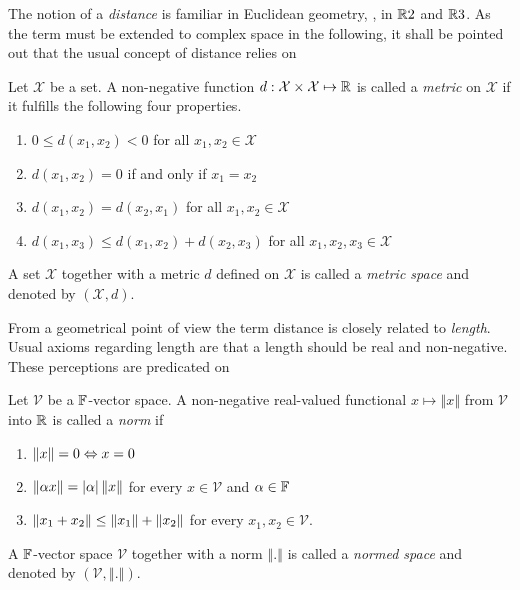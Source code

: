 The notion of a \emph{distance} is familiar in Euclidean geometry,
\ie, in $\mathbb{R}2$ and
$\mathbb{R}3$.
As the term must be extended to complex space in the following, it shall be
pointed out that the usual concept of distance relies on
\begin{definition}\label{def:metric}
	Let $\mathcal{X}$ be a set. A non-negative function
	$d: \mathcal{X} \times \mathcal{X} \mapsto \mathbb{R}$ is called a \emph{metric}
	on $\mathcal{X}$ if it fulfills the following four properties.
	\begin{enumerate}[label=(\alph*)]
		\item $0 \le d\left(x_1, x_2\right) < 0$ for all
		$x_1, x_2 \in \mathcal{X}$
		\item $d\left(x_1, x_2\right) = 0$ if and only if $x_1 = x_2$
		\item $d\left(x_1, x_2\right) = d\left(x_2, x_1\right)$ for all
		$x_1, x_2 \in \mathcal{X}$
		\item $d\left(x_1, x_3\right) \le d\left(x_1, x_2\right) + d\left(x_2, x_3\right)$
		for all $x_1, x_2, x_3 \in \mathcal{X}$
	\end{enumerate}
	A set $\mathcal{X}$ together with a metric $d$ defined on $\mathcal{X}$ is
	called a \emph{metric space} and denoted by $\left(\mathcal{X}, d\right)$.
\end{definition}

From a geometrical point of view the term distance is closely related to
\emph{length}.
Usual axioms regarding length are that a length should be real and non-negative.
These perceptions are predicated on
\begin{definition}\label{def:norm}
	Let $\mathcal{V}$ be a $\mathbb{F}$-vector space.
	A non-negative real-valued functional $x \mapsto \left\Vert x \right\Vert$
	from $\mathcal{V}$ into $\mathbb{R}$ is called a \emph{norm} if
	\begin{enumerate}[label=(\alph*)]
		\item $\left\Vert x \right\Vert = 0 \Leftrightarrow x = 0$ 
		\item $\left\Vert \alpha x \right\Vert = \left\vert\alpha\right\vert \left\Vert x \right\Vert$ for every
		$x \in \mathcal{V}$ and $\alpha \in \mathbb{F}$
		\item $\left\Vert x_1 + x_2 \right\Vert \le \left\Vert x_1 \right\Vert + \left\Vert x_2 \right\Vert$ for every
		$x_1, x_2 \in \mathcal{V}$.
	\end{enumerate}
	A $\mathbb{F}$-vector space $\mathcal{V}$ together with a norm
	$\left\Vert . \right\Vert$ is called a \emph{normed space} and denoted by
	$\left( \mathcal{V}, \left\Vert . \right\Vert \right)$.
\end{definition}


